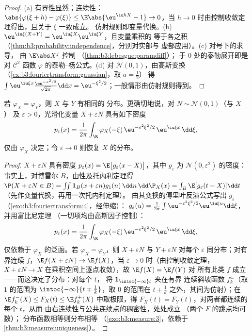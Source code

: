 \begin{proof}
(a) 有界性显然；连续性：$\abs{\varphi(\xi + h)
- \varphi(\xi)} \leq \E\abs{\eu^{\iu hX} - 1} \to 0$，当 $h
\to 0$ 时由控制收敛定理得出，且关于 $\xi$ 一致成立。
仿射规则即变量代换。(b) $\eu^{\iu\xi(X+Y)} =
\eu^{\iu\xi X}\eu^{\iu\xi Y}$，且变量乘积的
等于各之积
（\cref{thm:b3:probability:independence}，分别对实部与
虚部应用）。(c) 对号下的求导，
由 $\E\abs X^j$ 控制
（\cref{thm:b3:lebesgue:paramdiff}）；
于 $0$ 处的泰勒展开即是对 $\mathcal C^2$ 函数
$\varphi$ 的泰勒–杨公式。(d) 对 $\mathcal N(0,1)$，由高斯变换
（\cref{ex:b3:fouriertransform:gaussian}，取 $a = \frac12$）
得 $\int\eu^{\iu\xi x}\frac{\eu^{-x^2/2}}{\sqrt{2\pi}}\dd
x = \eu^{-\xi^2/2}$；一般情形由仿射规则得到。
\end{proof}

\begin{theorem}[单射性]\label{thm:b3:clt:injectivity}
若 $\varphi_X = \varphi_Y$，则 $X$ 与 $Y$ 有相同的
分布。更确切地说，对 $N \sim \mathcal N(0,1)$（与 $X$ ）
及 $\varepsilon > 0$，光滑化变量 $X +
\varepsilon N$ 具有如下密度
\[
p_\varepsilon(x) = \frac1{2\pi}\int_\R
\varphi_X(-\xi)\,\eu^{-\varepsilon^2\xi^2/2}\,
\eu^{\iu\xi x}\,\dd\xi ,
\]
仅由 $\varphi_X$ 决定；令 $\varepsilon \to 0$
则恢复 $X$ 的分布。
\end{theorem}

\begin{proof}
$X + \varepsilon N$ 具有密度 $p_\varepsilon(x) =
\E\bigl[g_\varepsilon(x - X)\bigr]$，其中 $g_\varepsilon$ 为
$\mathcal N(0, \varepsilon^2)$ 的密度：事实上，对博雷尔
$B$，由性及托内利定理得 $\P(X + \varepsilon N \in
B) = \int\!\!\int\mathbf 1_B(x + \varepsilon
n)g_1(n)\,\dd n\,\dd\P_X(x) = \int_B\E[g_\varepsilon(t -
X)]\dd t$（先作变量代换，再用一次托内利定理）。
由其变换的傅里叶反演公式写出 $g_\varepsilon$
（\cref{exo:b3:fouriertransform:4}，经伸缩）：
$g_\varepsilon(u) = \frac1{2\pi}\int
\eu^{-\varepsilon^2\xi^2/2}\eu^{\iu\xi u}\dd\xi$，并用富比尼定理
（一切项均由高斯因子控制）：
\[
p_\varepsilon(x) = \frac1{2\pi}\int_\R
\varphi_X(-\xi)\,\eu^{-\varepsilon^2\xi^2/2}\,
\eu^{\iu\xi x}\,\dd\xi ,
\]
仅依赖于 $\varphi_X$ 的泛函。若 $\varphi_X =
\varphi_Y$，则 $X + \varepsilon N$ 与 $Y + \varepsilon N$
对每个 $\varepsilon$ 同分布；对有界连续
$f$，$\E f(X + \varepsilon N) \to \E f(X)$，当 $\varepsilon
\to 0$ 时（由控制收敛定理，$X + \varepsilon N \to X$
在乘积空间上逐点收敛），故 $\E f(X) = \E f(Y)$ 对
所有此类 $f$ 成立——而这决定了分布：对每个 $t$，
将 $\mathbf 1_{\intoc{-\infty}t}$ 夹在有界
连续斜坡函数 $f_k^\pm$（取 $1$ 的范围为
$\intoc{-\infty}{t \mp \frac1k}$，取 $0$ 的范围在 $t \pm
\frac1k$ 之外，其间为仿射）；在 $\E
f_k^-(X) \leq F_X(t) \leq \E f_k^+(X)$ 中取极限，得 $F_X(t) =
F_Y(t)$，对两者都连续的每个 $t$，从而
由右连续性与公共连续点的稠密性，处处成立
（两个 $F$ 的跳点均可数）；
分布函数相等则分布相等
（\cref{exo:b3:measure:3}，依赖于
\cref{thm:b3:measure:uniqueness}）。
\end{proof}

